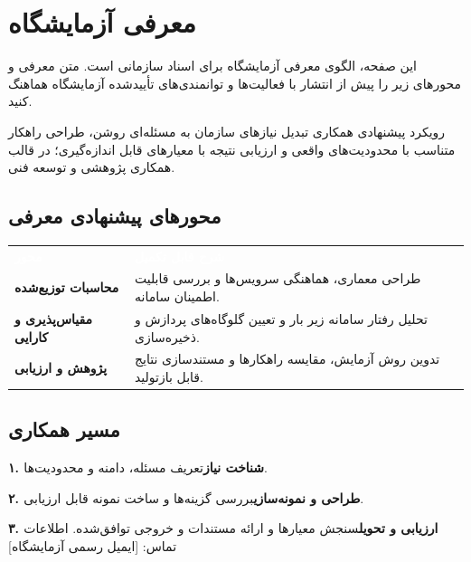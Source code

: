 \chapter*{معرفی آزمایشگاه}
{\color{DSCTeal}\bfseries\large\LabName\par}
\vspace{2mm}
این صفحه، الگوی معرفی آزمایشگاه برای اسناد سازمانی است. متن معرفی و محورهای زیر را پیش از انتشار با فعالیت‌ها و توانمندی‌های تأییدشده آزمایشگاه هماهنگ کنید.

\begin{DSCBox}{رویکرد پیشنهادی همکاری}
تبدیل نیازهای سازمان به مسئله‌ای روشن، طراحی راهکار متناسب با محدودیت‌های واقعی و ارزیابی نتیجه با معیارهای قابل اندازه‌گیری؛ در قالب همکاری پژوهشی و توسعه فنی.
\end{DSCBox}
\vspace{2mm}
\section*{محورهای پیشنهادی معرفی}
\begin{tabularx}{\linewidth}{@{}>{\raggedleft\arraybackslash}p{39mm}>{\raggedleft\arraybackslash}X@{}}
\rowcolor{DSCNavy}\textcolor{white}{\bfseries محور} & \textcolor{white}{\bfseries شرح قابل تکمیل}\\[2mm]
\rowcolor{DSCPale}\textbf{محاسبات توزیع‌شده} & طراحی معماری، هماهنگی سرویس‌ها و بررسی قابلیت اطمینان سامانه.\\[3mm]
\textbf{مقیاس‌پذیری و کارایی} & تحلیل رفتار سامانه زیر بار و تعیین گلوگاه‌های پردازش و ذخیره‌سازی.\\[3mm]
\rowcolor{DSCPale}\textbf{پژوهش و ارزیابی} & تدوین روش آزمایش، مقایسه راهکارها و مستندسازی نتایج قابل بازتولید.\\[3mm]
\end{tabularx}
\section*{مسیر همکاری}
\textbf{۱. شناخت نیاز}\quad تعریف مسئله، دامنه و محدودیت‌ها.\par
\textbf{۲. طراحی و نمونه‌سازی}\quad بررسی گزینه‌ها و ساخت نمونه قابل ارزیابی.\par
\textbf{۳. ارزیابی و تحویل}\quad سنجش معیارها و ارائه مستندات و خروجی توافق‌شده.
\vfill
{\small\color{DSCMuted}اطلاعات تماس: [ایمیل رسمی آزمایشگاه] }\par
\clearpage
